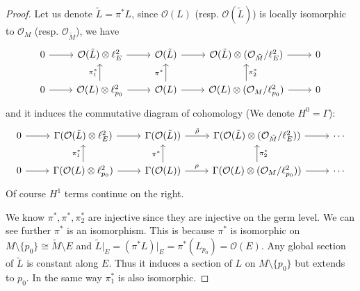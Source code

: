\documentclass[12pt]{article}
\begin{document}
\begin{proof}
  Let us denote \(\tilde{L}=\pi^*L\), since \(\mathcal{O}(L)\) (resp. 
  \(\mathcal{O}(\tilde{L})\)) is locally isomorphic to \(\mathcal{O}_M\)
  (resp. \(\mathcal{O}_{\tilde{M}}\)), we have 
  \[\begin{tikzcd}
    0 & {\mathcal{O}(\tilde{L})\otimes\ell_E^2} & {\mathcal{O}(\tilde{L})} & {\mathcal{O}({\tilde{L}})\otimes(\mathcal{O}_{\tilde{M}}/\ell_E^2)} & 0 \\
    0 & {\mathcal{O}(L)\otimes\ell_{p_0}^2} & {\mathcal{O}(L)} & {\mathcal{O}(L)\otimes(\mathcal{O}_M/\ell_{p_0}^2)} & 0
    \arrow[from=1-1, to=1-2]
    \arrow[from=2-1, to=2-2]
    \arrow["{\pi_1^*}", from=2-2, to=1-2]
    \arrow[from=1-2, to=1-3]
    \arrow[from=2-2, to=2-3]
    \arrow["{\pi^*}", from=2-3, to=1-3]
    \arrow[from=2-3, to=2-4]
    \arrow["{\pi_2^*}"', from=2-4, to=1-4]
    \arrow[from=1-3, to=1-4]
    \arrow[from=1-4, to=1-5]
    \arrow[from=2-4, to=2-5]
  \end{tikzcd}\]
  and it induces the commutative diagram of cohomology
  (We denote \(H^0=\Gamma\)):
  \[\begin{tikzcd}
    0 & {\Gamma(\mathcal{O}(\tilde{L})\otimes\ell_E^2)} & {\Gamma(\mathcal{O}(\tilde{L}))} & {\Gamma(\mathcal{O}({\tilde{L}})\otimes(\mathcal{O}_{\tilde{M}}/\ell_E^2))} & \cdots \\
    0 & {\Gamma(\mathcal{O}(L)\otimes\ell_{p_0}^2)} & {\Gamma(\mathcal{O}(L))} & {\Gamma(\mathcal{O}(L)\otimes(\mathcal{O}_M/\ell_{p_0}^2))} & \cdots
    \arrow[from=1-1, to=1-2]
    \arrow[from=2-1, to=2-2]
    \arrow["{\pi_1^*}", from=2-2, to=1-2]
    \arrow[from=1-2, to=1-3]
    \arrow[from=2-2, to=2-3]
    \arrow["{\pi^*}", from=2-3, to=1-3]
    \arrow["{\rho}", from=2-3, to=2-4]
    \arrow["{\pi_2^*}"', from=2-4, to=1-4]
    \arrow["{\tilde{\rho}}", from=1-3, to=1-4]
    \arrow[from=1-4, to=1-5]
    \arrow[from=2-4, to=2-5]
  \end{tikzcd}\]
  Of course \(H^1\) terms continue on the right.

  We know \(\pi^*,\pi^*,\pi_2^*\) are injective since they are injective on
  the germ level. We can see further \(\pi^*\) is an isomorphism. This is
  because \(\pi^*\) is isomorphic on \(M\setminus\{p_0\}\cong \tilde{M}\setminus
  E\) and \(\tilde{L}\big|_{E}=(\pi^*L)\big|_{E}=\pi^*(L_{p_0})=\mathcal{O}(E)\).
  Any global section of \(\tilde{L}\) is constant along \(E\). Thus it induces a
  section of \(L\) on \(M\setminus\{p_0\}\) but extends to \(p_0\). In the
  same way \(\pi_1^*\) is also isomorphic.


\end{proof}
\end{document}
